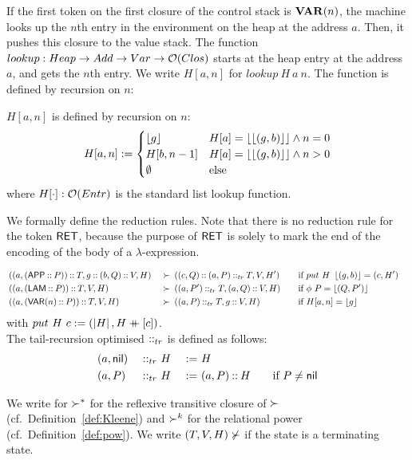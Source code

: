If the first token on the first closure of the control stack is $\mathsf{\mathbf{VAR}}(n)$, the machine looks up the
$n$th entry in the environment on the heap at the address $a$.  Then, it pushes this closure to the value stack.  The function $lookup : Heap \rightarrow Add
\rightarrow Var \rightarrow \mathcal{O}(Clos)$ starts at the heap entry at the address $a$, and gets the $n$th entry. We write $H[a,n]$ for
$lookup~H~a~n$.  The function is defined by recursion on $n$:
\begin{definition}[$lookup$]
  \label{def:lookup}
  $H[a,n]$ is defined by recursion on $n$:
  \[
    H[a,n] :=
    \begin{cases}
      \left\lfloor {g} \right\rfloor & H[a]=\left\lfloor {\left\lfloor {(g,b)} \right\rfloor} \right\rfloor \land n=0 \\
      H[b,n-1] & H[a]=\left\lfloor {\left\lfloor {(g,b)} \right\rfloor} \right\rfloor \land n>0 \\
      \emptyset & \text{else}
    \end{cases}
  \]
  where $H[\cdot] : \mathcal{O}(Entr)$ is the standard list lookup function.
\end{definition}


We formally define the reduction rules.  Note that there is no reduction rule for the token $\mathsf{RET}$, because the purpose of $\mathsf{RET}$ is solely to
mark the end of the encoding of the body of a $\lambda$-expression.
\begin{definition}
  {\small
    \begin{alignat*}{4}
      & \left((a, (\mathsf{APP} \mathbin{::} P)) \mathbin{::} T, g \mathbin{::} (b, Q) \mathbin{::} V, H\right) &~\succ~& \left((c, Q) \mathbin{::} (a,P) \mathbin{::}_{tr} T, V, H'\right)
      \quad&& \text{if $put~H~\left\lfloor {(g,b)} \right\rfloor = (c,H')$} \\
      & \left((a, (\mathsf{LAM} \mathbin{::} P)) \mathbin{::} T, V, H\right)                      &~\succ~& \left((a, P') \mathbin{::}_{tr} T, (a,Q) \mathbin{::} V, H\right)
      \quad&& \text{if $\phi~P = \left\lfloor {(Q, P')} \right\rfloor$} & \\
      & \left((a, (\mathsf{VAR}(n) \mathbin{::} P)) \mathbin{::} T, V, H\right)                   &~\succ~& \left((a, P) \mathbin{::}_{tr} T, g \mathbin{::} V, H\right)
      \quad&& \text{if $H[a,n]=\left\lfloor {g} \right\rfloor$} &
    \end{alignat*}
  }
  with $put~H~c := (\left| H \right|, H \mathbin{+\mkern-10mu+} [c]) $.\\
  The tail-recursion optimised $\mathbin{::}_{tr}$ is defined as follows:
  \begin{alignat*}{3}
    & (a, \mathsf{nil}) &~\mathbin{::}_{tr}~& H &~:=~& H \\
    & (a, P   ) &~\mathbin{::}_{tr}~& H &~:=~& (a, P) \mathbin{::} H \qquad\text{if $P \neq \mathsf{nil}$}
  \end{alignat*}

  We write for $\succ^*$ for the reflexive transitive closure of $\succ$ (cf.\ Definition~\ref{def:Kleene}) and $\succ^k$ for the relational power (cf.\
  Definition~\ref{def:pow}).  We write $(T,V,H) \nsucc$ if the state is a terminating state.
\end{definition}

